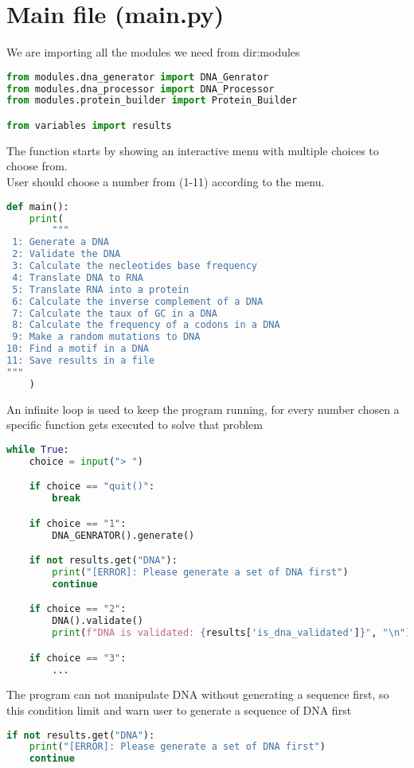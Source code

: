 \documentclass[11pt]{article}
\begin{document}
\section{Main file (main.py)}
We are importing all the modules we need from dir:modules
\begin{lstlisting}[language=Python, style=PythonStyle]
from modules.dna_generator import DNA_Genrator
from modules.dna_processor import DNA_Processor
from modules.protein_builder import Protein_Builder

from variables import results
\end{lstlisting}
The function starts by showing an interactive menu with multiple choices to choose from.\\
User should choose a number from (1-11) according to the menu.
\begin{lstlisting}[language=Python, style=PythonStyle]
def main():
    print(
        """
 1: Generate a DNA
 2: Validate the DNA
 3: Calculate the necleotides base frequency
 4: Translate DNA to RNA
 5: Translate RNA into a protein
 6: Calculate the inverse complement of a DNA
 7: Calculate the taux of GC in a DNA
 8: Calculate the frequency of a codons in a DNA
 9: Make a random mutations to DNA
10: Find a motif in a DNA
11: Save results in a file
"""
    )
\end{lstlisting}
An infinite loop is used to keep the program running,
for every number chosen a specific function gets executed to solve that problem
\begin{lstlisting}[language=Python, style=PythonStyle]
while True:
    choice = input("> ")

    if choice == "quit()":
        break

    if choice == "1":
        DNA_GENRATOR().generate()

    if not results.get("DNA"):
        print("[ERROR]: Please generate a set of DNA first")
        continue

    if choice == "2":
        DNA().validate()
        print(f"DNA is validated: {results['is_dna_validated']}", "\n")

    if choice == "3":
        ...

\end{lstlisting}
The program can not manipulate DNA without generating a sequence first, so this condition limit and warn user to generate a sequence of DNA first
\begin{lstlisting}[language=Python, style=PythonStyle]
if not results.get("DNA"):
    print("[ERROR]: Please generate a set of DNA first")
    continue
\end{lstlisting}
\end{document}
